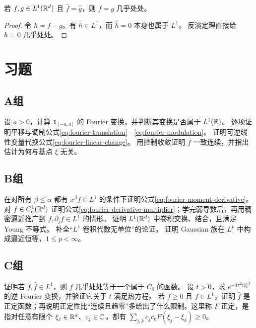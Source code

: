 \begin{corollary}[唯一性]\label{cor:fourier-lone-uniqueness}
若 \(f,g\in L^1(\mathbb{R}^d)\) 且 \(\widehat f=\widehat g\)，则 \(f=g\) 几乎处处。
\end{corollary}
\begin{proof}
令 \(h=f-g\)。有 \(h\in L^1\)，而 \(\widehat h=0\) 本身也属于 \(L^1\)。
反演定理直接给 \(h=0\) 几乎处处。
\end{proof}

\section*{习题}
\subsection*{A组}
\begin{enumerate}[label=\textbf{\thechapter.\arabic*.}]
设 \(a>0\)，计算 \(\mathbf1_{[-a,a]}\) 的 Fourier 变换，并判断其变换是否属于 \(L^1(\mathbb{R})\)。
逐项证明平移与调制公式\eqref{eq:fourier-translation}—\eqref{eq:fourier-modulation}。
证明可逆线性变量代换公式\eqref{eq:fourier-linear-change}。
用控制收敛证明 \(\widehat f\) 一致连续，并指出估计为何与基点 \(\xi\) 无关。
\end{enumerate}
\subsection*{B组}
\begin{enumerate}[label=\textbf{\thechapter.\arabic*.},resume]
在对所有 \(\beta\le\alpha\) 都有 \(x^\beta f\in L^1\) 的条件下证明公式\eqref{eq:fourier-moment-derivative}。
对 \(f\in C_c^1(\mathbb{R}^d)\) 证明公式\eqref{eq:fourier-derivative-multiplier}；学完弱导数后，再用稠密逼近推广到 \(f,\partial_jf\in L^1\) 的情形。
证明 \(L^1(\mathbb{R}^d)\) 中卷积交换、结合，且满足 Young 不等式。
补全“\(L^1\) 卷积代数无单位”的论证。
证明 Gaussian 族在 \(L^p\) 中构成逼近恒等，\(1\le p<\infty\)。
\end{enumerate}
\subsection*{C组}
\begin{enumerate}[label=\textbf{\thechapter.\arabic*.},resume]
证明若 \(f,\widehat f\in L^1\)，则 \(f\) 几乎处处等于一个属于 \(C_0\) 的函数。
设 \(t>0\)，求 \(e^{-4\pi^2t|\xi|^2}\) 的逆 Fourier 变换，并验证它关于 \(t\) 满足热方程。
若 \(f\ge0\) 且 \(f\in L^1\)，证明 \(\widehat f\) 是正定函数；再说明正定性比“连续且趋零”多给出了什么限制。这里称 \(F\) 正定，是指对任意有限个 \(\xi_j\in\mathbb{R}^d\)、\(c_j\in\mathbb{C}\)，都有 \(\sum_{j,k}c_j\overline{c_k}F(\xi_j-\xi_k)\ge0\)。
\end{enumerate}
